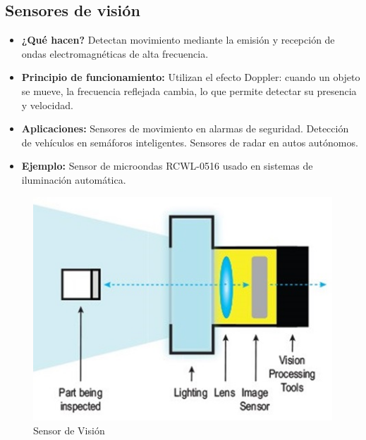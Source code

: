 \subsection*{Sensores de visión}
\begin{itemize}
	\item \textbf{¿Qué hacen?} Detectan movimiento mediante la emisión y recepción de ondas electromagnéticas de alta frecuencia.
	\item \textbf{Principio de funcionamiento:} Utilizan el efecto Doppler: cuando un objeto se mueve, la frecuencia reflejada cambia, lo que permite detectar su presencia y velocidad.
	\item \textbf{Aplicaciones:} Sensores de movimiento en alarmas de seguridad.
	Detección de vehículos en semáforos inteligentes.
	Sensores de radar en autos autónomos.
	\item \textbf{Ejemplo:} Sensor de microondas RCWL-0516 usado en sistemas de iluminación automática.\cite{cognex_vision_sensor}
\end{itemize}
\begin{figure}[h]
	\centering
	\includegraphics[width=0.3\linewidth]{img/sensor de vision}
	\caption{Sensor de Visión}
	\label{fig:sensor vision}
\end{figure}
